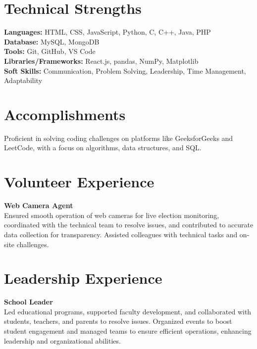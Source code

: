 \documentclass[a4paper,10pt]{article}
\begin{document}
	\section*{Technical Strengths}
	\textbf{Languages:} HTML, CSS, JavaScript, Python, C, C++, Java, PHP \\
	\textbf{Database:} MySQL, MongoDB \\
	\textbf{Tools:} Git, GitHub, VS Code \\
	\textbf{Libraries/Frameworks:} React.js, pandas, NumPy, Matplotlib \\
	\textbf{Soft Skills:} Communication, Problem Solving, Leadership, Time Management, Adaptability
	
	\section*{Accomplishments}
	Proficient in solving coding challenges on platforms like GeeksforGeeks and LeetCode, with a focus on algorithms, data structures, and SQL.
	
	\section*{Volunteer Experience}
	\textbf{Web Camera Agent} \\
	Ensured smooth operation of web cameras for live election monitoring, coordinated with the technical team to resolve issues, and contributed to accurate data collection for transparency. Assisted colleagues with technical tasks and on-site challenges.
	
	\section*{Leadership Experience}
	\textbf{School Leader} \\
	Led educational programs, supported faculty development, and collaborated with students, teachers, and parents to resolve issues. Organized events to boost student engagement and managed teams to ensure efficient operations, enhancing leadership and organizational abilities.
	
\end{document}
